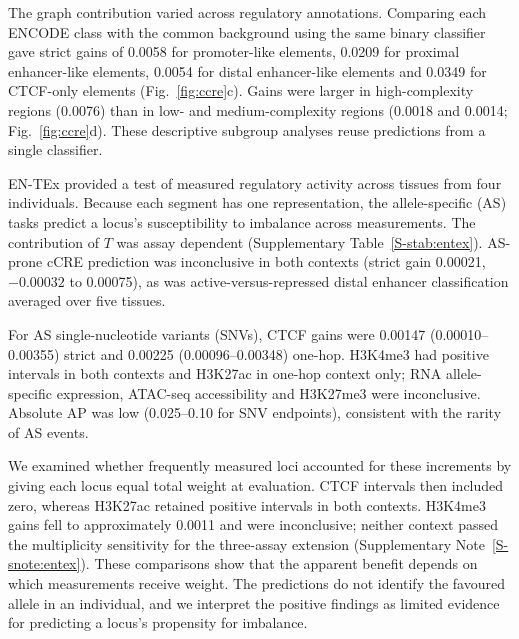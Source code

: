 \documentclass[11pt]{article}
\begin{document}
\begin{bibunit}[unsrtnat]
The graph contribution varied across regulatory annotations. Comparing each ENCODE class with the common background using the same binary classifier gave strict gains of 0.0058 for promoter-like elements, 0.0209 for proximal enhancer-like elements, 0.0054 for distal enhancer-like elements and 0.0349 for CTCF-only elements (Fig.~\ref{fig:ccre}c). Gains were larger in high-complexity regions (0.0076) than in low- and medium-complexity regions (0.0018 and 0.0014; Fig.~\ref{fig:ccre}d). These descriptive subgroup analyses reuse predictions from a single classifier.

EN-TEx provided a test of measured regulatory activity across tissues from four individuals\cite{rozowsky2023entex}. Because each segment has one representation, the allele-specific (AS) tasks predict a locus's susceptibility to imbalance across measurements. The contribution of $T$ was assay dependent (Supplementary Table~\ref{S-stab:entex}). AS-prone cCRE prediction was inconclusive in both contexts (strict gain 0.00021, $-0.00032$ to 0.00075), as was active-versus-repressed distal enhancer classification averaged over five tissues.

For AS single-nucleotide variants (SNVs), CTCF gains were 0.00147 (0.00010--0.00355) strict and 0.00225 (0.00096--0.00348) one-hop. H3K4me3 had positive intervals in both contexts and H3K27ac in one-hop context only; RNA allele-specific expression, ATAC-seq accessibility and H3K27me3 were inconclusive. Absolute AP was low (0.025--0.10 for SNV endpoints), consistent with the rarity of AS events.

We examined whether frequently measured loci accounted for these increments by giving each locus equal total weight at evaluation. CTCF intervals then included zero, whereas H3K27ac retained positive intervals in both contexts. H3K4me3 gains fell to approximately 0.0011 and were inconclusive; neither context passed the multiplicity sensitivity for the three-assay extension (Supplementary Note~\ref{S-snote:entex}). These comparisons show that the apparent benefit depends on which measurements receive weight. The predictions do not identify the favoured allele in an individual, and we interpret the positive findings as limited evidence for predicting a locus's propensity for imbalance.


\end{bibunit}
\end{document}
